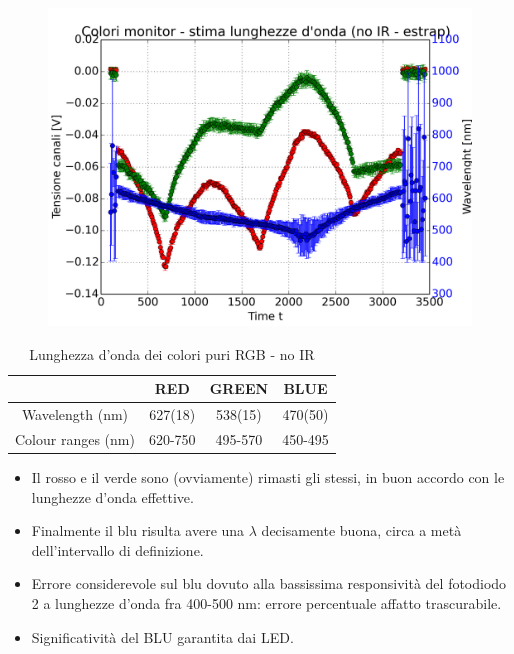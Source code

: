 \documentclass{beamer}
\begin{document}
\begin{frame}
\begin{figure}
\centering
\includegraphics[width=0.6\linewidth]{./monitor_stima_lunghezzaonda_senzaIR_extended}
\label{fig:monitor_stima_lunghezzaonda_senzaIR_extended}
\end{figure}

\begin{table}[h]
\centering
\begin{tabular}{c|c|c|c}
  & \textbf{RED} & \textbf{GREEN} & \textbf{BLUE} \\ 
 \hline Wavelength (nm) & 627(18) & 538(15) & 470(50) \\
 Colour ranges (nm) & 620-750 & 495-570 & 450-495 \\ 
\hline 
\end{tabular} 
\caption{Lunghezza d'onda dei colori puri RGB - no IR}
\label{RGB_lambda_noIR_ext}
\end{table}
\end{frame}

\begin{frame}
\begin{itemize}
\item Il rosso e il verde sono (ovviamente) rimasti gli stessi, in buon accordo con le lunghezze d'onda effettive.
\item Finalmente il blu risulta avere una $\lambda$ decisamente buona, circa a metà dell'intervallo di definizione.
\item Errore considerevole sul blu dovuto alla bassissima responsività del fotodiodo 2 a lunghezze d'onda fra 400-500 nm: errore percentuale affatto trascurabile.
\item Significatività del BLU garantita dai LED.
\end{itemize}
\end{frame}
\end{document}
